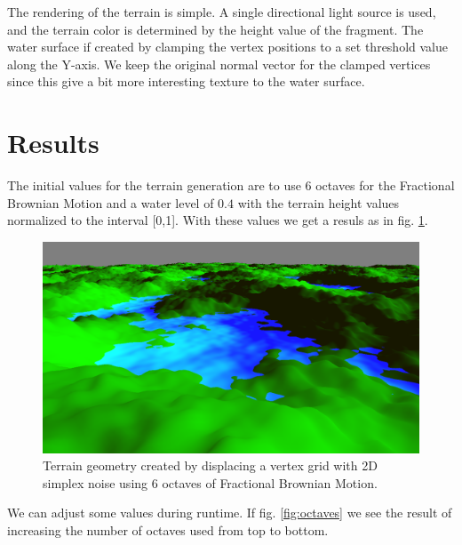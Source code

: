 \documentclass[12pt]{article}
\begin{document}
The rendering of the terrain is simple. A single directional light source is used, and the terrain color is determined by the height value of the fragment. The water surface if created by clamping the vertex positions to a set threshold value along the Y-axis. We keep the original normal vector for the clamped vertices since this give a bit more interesting texture to the water surface.

\section{Results}
The initial values for the terrain generation are to use 6 octaves for the Fractional Brownian Motion and a water level of $0.4$ with the terrain height values normalized to the interval [0,1]. With these values we get a resuls as in fig. \ref{fig:terrain_init}.

\begin{figure}[h]
	\includegraphics[width=\textwidth]{terrain_init.png}
	\centering
	\caption{Terrain geometry created by displacing a vertex grid with 2D simplex noise using 6 octaves of Fractional Brownian Motion.}
	\label{fig:terrain_init}
\end{figure}

We can adjust some values during runtime. If fig. \ref{fig:octaves} we see the result of increasing the number of octaves used from top to bottom.
\end{document}
